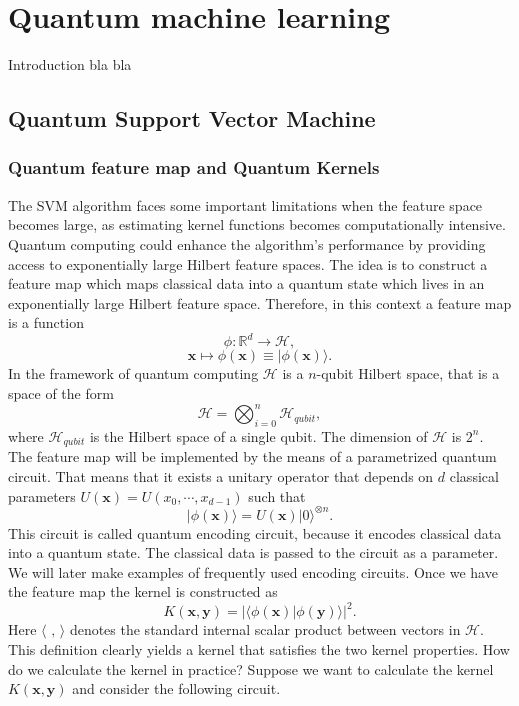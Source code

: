 \documentclass[a4paper]{article}
\begin{document}
\section{Quantum machine learning}
Introduction bla bla

\subsection{Quantum Support Vector Machine}
\subsubsection{Quantum feature map and Quantum Kernels}
The SVM algorithm faces some important limitations when the feature space becomes large, as estimating kernel functions becomes computationally intensive. Quantum computing could enhance the algorithm's performance by providing access to exponentially large Hilbert feature spaces. The idea is to construct a feature map which maps classical data into a quantum state which lives in an exponentially large Hilbert feature space. Therefore, in this context a feature map is a function 
\begin{equation}
    \phi: \mathbb{R}^d \rightarrow \mathcal{H},
\end{equation}
$$\mathbf{x}\mapsto \phi(\mathbf{x})\equiv |\phi(\mathbf{x})\rangle.$$
In the framework of quantum computing $\mathcal{H}$ is a $n$-qubit Hilbert space, that is a space of the form
\begin{equation}
    \mathcal{H}=\bigotimes_{i=0}^n \mathcal{H}_{qubit},
\end{equation}
where $\mathcal{H}_{qubit}$ is the Hilbert space of a single qubit. The dimension of $\mathcal{H}$ is $2^n$. The feature map will be implemented by the means of a parametrized quantum circuit. That means that it exists a unitary operator that depends on $d$ classical parameters $U(\mathbf{x})=U(x_0,\cdots, x_{d-1})$ such that 
\begin{equation}
    |\phi(\mathbf{x})\rangle=U(\mathbf{x})|0\rangle^{\otimes n}.
\end{equation}
This circuit is called quantum encoding circuit, because it encodes classical data into a quantum state. The classical data is passed to the circuit as a parameter. We will later make examples of frequently used encoding circuits. 
Once we have the feature map the kernel is constructed as 
\begin{equation}
    K(\mathbf{x}, \mathbf{y})=\left | \langle \phi(\mathbf{x})|\phi(\mathbf{y})\rangle \right |^2.
\end{equation}
Here $\langle\,\,, \,\rangle$ denotes the standard internal scalar product between vectors in $\mathcal{H}$. This definition clearly yields a kernel that satisfies the two kernel properties. How do we calculate the kernel in practice? Suppose we want to calculate the kernel $K(\mathbf{x}, \mathbf{y})$ and consider the following circuit. 
\end{document}
